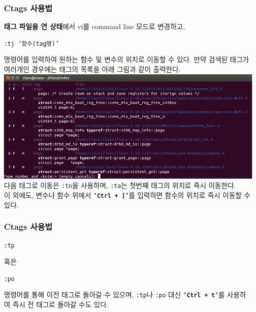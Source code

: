 \documentclass[newPxFont,sthlmFooter,nooffset]{beamer}
\begin{document}
\begin{frame}[containsverbatim,t]
  \frametitle{Ctags 사용법}
\begin{footnotesize}
\textbf{태그 파일을 연 상태}에서 vi를 command line 모드로 변경하고,
\begin{mdframed}[backgroundcolor=lightgray,hidealllines=true]
\texttt{\textcolor[rgb]{0,0,0}{:tj `함수(tag명)'}}
\end{mdframed}
\bigskip
명령어를 입력하여 원하는 함수 및 변수의 위치로 이동할 수 있다. 만약 검색된 태그가 여러개인 경우에는 태그의 목록을 아래 그림과 같이 출력한다.\\
\includegraphics[width=0.8\linewidth]{./figure/ts.png}
\\
다음 태그로 이동은 \texttt{:tn}을 사용하며, \texttt{:ta}는 첫번째 태그의 위치로 즉시 이동한다.
\\
이 외에도, 변수나 함수 위에서 \textbf{\texttt{`Ctrl + ]'}}를 입력하면 함수의 위치로 즉시 이동할 수 있다.
\end{footnotesize}
\end{frame}
\begin{frame}[containsverbatim,t]
  \frametitle{Ctags 사용법}
\begin{mdframed}[backgroundcolor=lightgray,hidealllines=true]
\texttt{\textcolor[rgb]{0,0,0}{:tp}}
\end{mdframed}
\bigskip
혹은\\
\begin{mdframed}[backgroundcolor=lightgray,hidealllines=true]
\texttt{\textcolor[rgb]{0,0,0}{:po}}
\end{mdframed}
\bigskip
명령어를 통해 이전 태그로 돌아갈 수 있으며, \texttt{:tp}나 \texttt{:po} 대신 \textbf{\texttt{`Ctrl + t'}}를 사용하여 즉시 전 태그로 돌아갈 수도 있다.
\end{frame}
\end{document}
